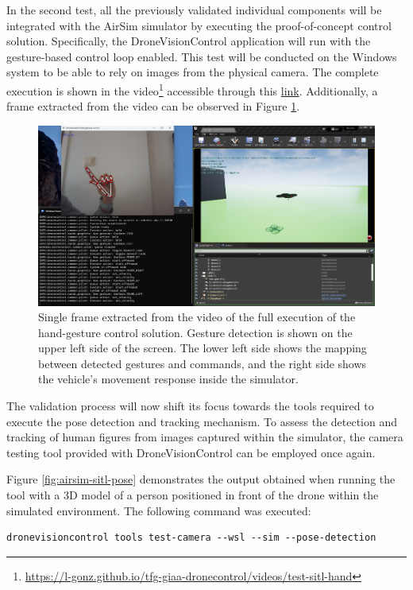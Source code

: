 

In the second test, all the previously validated individual components will be integrated with the AirSim simulator by executing the proof-of-concept control solution. Specifically, the DroneVisionControl application will run with the gesture-based control loop enabled. This test will be conducted on the Windows system to be able to rely on images from the physical camera.
The complete execution is shown in the video\footnote{\url{https://l-gonz.github.io/tfg-giaa-dronecontrol/videos/test-sitl-hand}} accessible through this \href{https://l-gonz.github.io/tfg-giaa-dronecontrol/videos/test-sitl-hand}{link}. Additionally, a frame extracted from the video can be observed in Figure \ref{fig:sitl-hand-video}.

\begin{figure}
  \centering
  \includegraphics[width=\textwidth, keepaspectratio]{img/video-hand-sitl.png}
  \caption{Single frame extracted from the video of the full execution of the hand-gesture control solution. Gesture detection is shown on the upper left side of the screen. The lower left side shows the mapping between detected gestures and commands, and the right side shows the vehicle's movement response inside the simulator.}
  \label{fig:sitl-hand-video}
\end{figure}



The validation process will now shift its focus towards the tools required to execute the pose detection and tracking mechanism. To assess the detection and tracking of human figures from images captured within the simulator, the camera testing tool provided with DroneVisionControl can be employed once again.

Figure \ref{fig:airsim-sitl-pose} demonstrates the output obtained when running the tool with a 3D model of a person positioned in front of the drone within the simulated environment. The following command was executed: 
\begin{verbatim}
dronevisioncontrol tools test-camera --wsl --sim --pose-detection
\end{verbatim}


